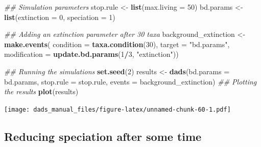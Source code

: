 \documentclass[]{book}
\newenvironment{Shaded}{\begin{snugshade}}{\end{snugshade}}
\newcommand{\CommentTok}[1]{\textcolor[rgb]{0.56,0.35,0.01}{\textit{#1}}}
\newcommand{\DataTypeTok}[1]{\textcolor[rgb]{0.13,0.29,0.53}{#1}}
\newcommand{\DecValTok}[1]{\textcolor[rgb]{0.00,0.00,0.81}{#1}}
\newcommand{\KeywordTok}[1]{\textcolor[rgb]{0.13,0.29,0.53}{\textbf{#1}}}
\newcommand{\NormalTok}[1]{#1}
\newcommand{\OperatorTok}[1]{\textcolor[rgb]{0.81,0.36,0.00}{\textbf{#1}}}
\newcommand{\StringTok}[1]{\textcolor[rgb]{0.31,0.60,0.02}{#1}}
\begin{document}
\begin{Shaded}
\begin{Highlighting}[]
\CommentTok{## Simulation parameters}
\NormalTok{stop.rule <-}\StringTok{ }\KeywordTok{list}\NormalTok{(}\DataTypeTok{max.living =} \DecValTok{50}\NormalTok{)}
\NormalTok{bd.params <-}\StringTok{ }\KeywordTok{list}\NormalTok{(}\DataTypeTok{extinction =} \DecValTok{0}\NormalTok{, }\DataTypeTok{speciation =} \DecValTok{1}\NormalTok{)}

\CommentTok{## Adding an extinction parameter after 30 taxa}
\NormalTok{background_extinction <-}\StringTok{ }\KeywordTok{make.events}\NormalTok{(}
                      \DataTypeTok{condition    =} \KeywordTok{taxa.condition}\NormalTok{(}\DecValTok{30}\NormalTok{),}
                      \DataTypeTok{target       =} \StringTok{"bd.params"}\NormalTok{,}
                      \DataTypeTok{modification =} \KeywordTok{update.bd.params}\NormalTok{(}\DecValTok{1}\OperatorTok{/}\DecValTok{3}\NormalTok{, }\StringTok{"extinction"}\NormalTok{))}

\CommentTok{## Running the simulations}
\KeywordTok{set.seed}\NormalTok{(}\DecValTok{2}\NormalTok{)}
\NormalTok{results <-}\StringTok{ }\KeywordTok{dads}\NormalTok{(}\DataTypeTok{bd.params =}\NormalTok{ bd.params,}
                \DataTypeTok{stop.rule =}\NormalTok{ stop.rule,}
                \DataTypeTok{events    =}\NormalTok{ background_extinction)}
\CommentTok{## Plotting the results}
\KeywordTok{plot}\NormalTok{(results)}
\end{Highlighting}
\end{Shaded}

\texttt{[image: dads\_manual\_files/figure-latex/unnamed-chunk-60-1.pdf]}

\hypertarget{reducing-speciation-after-some-time}{%
\subsection{Reducing speciation after some time}\label{reducing-speciation-after-some-time}}
\end{document}
